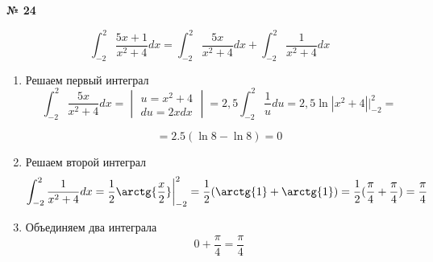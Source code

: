 \documentclass{article}
\begin{document}
\textbf{№ 24} 

\begingroup

\Large

$$ \int_{-2}^{2} \frac{5x+1}{x^2+4} dx 
= \int_{-2}^{2} \frac{5x}{x^2+4} dx + \int_{-2}^{2} \frac{1}{x^2+4} dx $$

\begin{enumerate}
\item Решаем первый интеграл
$$ \int_{-2}^{2} \frac{5x}{x^2+4} dx 
= \begin{vmatrix} u = x^2+4 \\ 
                 du = 2xdx \end{vmatrix} 
= 2,5 \int_{-2}^{2} \frac{1}{u} du 
= 2,5 \ln{\left| x^2+4 \right|} \bigg\vert_{-2}^{2} 
= $$

$$ = 2.5 (\ln{8} - \ln{8})
= 0 $$

\item Решаем второй интеграл
$$ \int_{-2}^{2} \frac{1}{x^2+4} dx 
= \frac{1}{2} \arctg{\frac{x}{2}} \bigg\vert_{-2}^{2}
= \frac{1}{2} (\arctg{1} + \arctg{1})
= \frac{1}{2} (\frac{\pi}{4} + \frac{\pi}{4})
= \frac{\pi}{4} $$

\item Объединяем два интеграла
$$ 0 + \frac{\pi}{4} = \frac{\pi}{4} $$

\end{enumerate}

\endgroup
\end{document}
